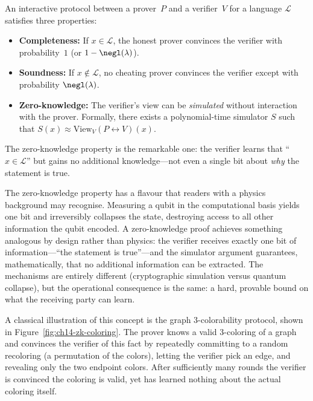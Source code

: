 \begin{definition}
\label{def:zkp}
An interactive protocol between a prover~$P$ and a verifier~$V$ for a language $\mathcal{L}$ satisfies three properties:
\begin{itemize}
\item \textbf{Completeness:} If $x \in \mathcal{L}$, the honest prover convinces the verifier with probability~$1$ (or $1 - \negl(\lambda)$).
\item \textbf{Soundness:} If $x \notin \mathcal{L}$, no cheating prover convinces the verifier except with probability $\negl(\lambda)$.
\item \textbf{Zero-knowledge:} The verifier's view can be \emph{simulated} without interaction with the prover.  Formally, there exists a polynomial-time simulator $S$ such that $S(x) \approx \mathrm{View}_V(P \leftrightarrow V)(x)$.
\end{itemize}
\end{definition}

The zero-knowledge property is the remarkable one: the verifier learns that ``$x \in \mathcal{L}$'' but gains no additional knowledge---not even a single bit about \emph{why} the statement is true.

The zero-knowledge property has a flavour that readers with a physics background may recognise.  Measuring a qubit in the computational basis yields one bit and irreversibly collapses the state, destroying access to all other information the qubit encoded.  A zero-knowledge proof achieves something analogous by design rather than physics: the verifier receives exactly one bit of information---``the statement is true''---and the simulator argument guarantees, mathematically, that no additional information can be extracted.  The mechanisms are entirely different (cryptographic simulation versus quantum collapse), but the operational consequence is the same: a hard, provable bound on what the receiving party can learn.

A classical illustration of this concept is the graph 3-colorability protocol, shown in Figure~\ref{fig:ch14-zk-coloring}.  The prover knows a valid 3-coloring of a graph and convinces the verifier of this fact by repeatedly committing to a random recoloring (a permutation of the colors), letting the verifier pick an edge, and revealing only the two endpoint colors.  After sufficiently many rounds the verifier is convinced the coloring is valid, yet has learned nothing about the actual coloring itself.

